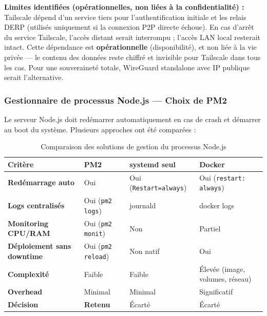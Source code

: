\documentclass[12pt,a4paper]{article}
\begin{document}
\begin{warnbox}
\textbf{Limites identifiées (opérationnelles, non liées à la confidentialité) :} Tailscale dépend d'un service tiers pour l'authentification initiale et les relais DERP (utilisés uniquement si la connexion P2P directe échoue). En cas d'arrêt du service Tailscale, l'accès distant serait interrompu ; l'accès LAN local resterait intact. Cette dépendance est \textbf{opérationnelle} (disponibilité), et non liée à la vie privée --- le contenu des données reste chiffré et invisible pour Tailscale dans tous les cas. Pour une souveraineté totale, WireGuard standalone avec IP publique serait l'alternative.
\end{warnbox}

\subsubsection{Gestionnaire de processus Node.js --- Choix de PM2}

Le serveur Node.js doit redémarrer automatiquement en cas de crash et démarrer au boot du système. Plusieurs approches ont été comparées :

\begin{table}[H]
\centering
\small
\renewcommand{\arraystretch}{1.3}
\begin{tabular}{|l|p{3cm}|p{3cm}|p{3cm}|}
\hline
\textbf{Critère} & \textbf{PM2} & \textbf{systemd seul} & \textbf{Docker} \\
\hline
\textbf{Redémarrage auto} & Oui & Oui (\texttt{Restart=always}) & Oui (\texttt{restart: always}) \\
\hline
\textbf{Logs centralisés} & Oui (\texttt{pm2 logs}) & journald & docker logs \\
\hline
\textbf{Monitoring CPU/RAM} & Oui (\texttt{pm2 monit}) & Non & Partiel \\
\hline
\textbf{Déploiement sans downtime} & Oui (\texttt{pm2 reload}) & Non natif & Oui \\
\hline
\textbf{Complexité} & Faible & Faible & Élevée (image, volumes, réseau) \\
\hline
\textbf{Overhead} & Minimal & Minimal & Significatif \\
\hline
\textbf{Décision} & \textcolor{green!60!black}{\textbf{Retenu}} & Écarté & Écarté \\
\hline
\end{tabular}
\caption{Comparaison des solutions de gestion du processus Node.js}
\end{table}
\end{document}
